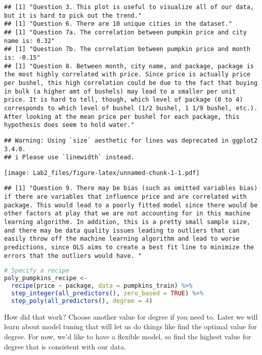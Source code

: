 \documentclass[
]{article}
\begin{document}
\begin{lstlisting}
## [1] "Question 3. This plot is useful to visualize all of our data, but it is hard to pick out the trend."
## [1] "Question 6. There are 10 unique cities in the dataset."
## [1] "Question 7a. The correlation between pumpkin price and city name is: 0.32"
## [1] "Question 7b. The correlation between pumpkin price and month is: -0.15"
## [1] "Question 8. Between month, city name, and package, package is the most highly correlated with price. Since price is actually price per bushel, this high correlation could be due to the fact that buying in bulk (a higher amt of bushels) may lead to a smaller per unit price. It is hard to tell, though, which level of package (0 to 4) corresponds to which level of bushel (1/2 bushel, 1 1/9 bushel, etc.). After looking at the mean price per bushel for each package, this hypothesis does seem to hold water."
\end{lstlisting}

\begin{lstlisting}
## Warning: Using `size` aesthetic for lines was deprecated in ggplot2 3.4.0.
## i Please use `linewidth` instead.
\end{lstlisting}

\texttt{[image: Lab2\_files/figure-latex/unnamed-chunk-1-1.pdf]}

\begin{lstlisting}
## [1] "Question 9. There may be bias (such as omitted variables bias) if there are variables that influence price and are correlated with package. This would lead to a poorly fitted model since there would be other factors at play that we are not accounting for in this machine learning algorithm. In addition, this is a pretty small sample size, and there may be data quality issues leading to outliers that can easily throw off the machine learning algorithm and lead to worse predictions, since OLS aims to create a best fit line to minimize the errors that the outliers would have. "
\end{lstlisting}

\begin{lstlisting}[language=R]
# Specify a recipe
poly_pumpkins_recipe <-
  recipe(price ~ package, data = pumpkins_train) %>%
  step_integer(all_predictors(), zero_based = TRUE) %>% 
  step_poly(all_predictors(), degree = 4)
\end{lstlisting}

How did that work? Choose another value for degree if you need to. Later
we will learn about model tuning that will let us do things like find
the optimal value for degree. For now, we'd like to have a flexible
model, so find the highest value for degree that is consistent with our
data.
\end{document}
